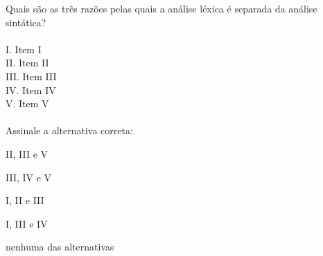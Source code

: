\question[10]

Quais são as três razões pelas quais a análise léxica é separada da análise sintática?\\
\\
I. Item I\\
II. Item II\\
III. Item III\\
IV. Item IV\\
V. Item V\\
\\
Assinale a alternativa correta:
\begin{choices}
\item II, III e V %
\item III, IV e V
\item I, II e III
\item I, III e IV
\item nenhuma das alternativas
\end{choices}
\answerline

